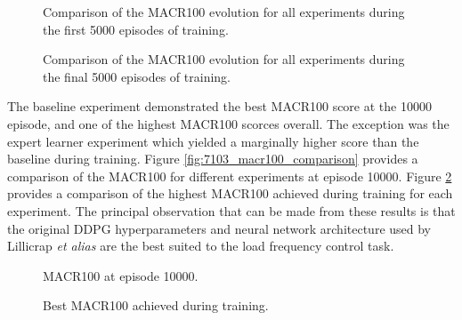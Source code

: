 \begin{figure}[h]
	\centering
	
	
	\caption{Comparison of the MACR100 evolution for all experiments during the first 5000 episodes of training.}\label{fig:7101_MACR100_first}
	
	\vspace{0.5cm}
	
	
	\caption{Comparison of the MACR100 evolution for all experiments during the final 5000 episodes of training.}\label{fig:7102_MACR100_second}
\end{figure}

\clearpage

The baseline experiment demonstrated the best MACR100 score at the 10000 episode, and one of the highest MACR100 scorces overall. The exception was the expert learner experiment which yielded a marginally higher score than the baseline during training. Figure \ref{fig:7103_macr100_comparison} provides a comparison of the MACR100 for different experiments at episode 10000. Figure \ref{fig:7104_macr100_comparison} provides a comparison of the highest MACR100 achieved during training for each experiment. The principal observation that can be made from these results is that the original DDPG hyperparameters and neural network architecture used by Lillicrap \textit{et alias} are the best suited to the load frequency control task.

\begin{figure}[h]
	\begin{minipage}{0.50\textwidth}
		\centering
		\resizebox{7cm}{!}{}
		\caption{MACR100 at episode 10000.}\label{fig:7103_macr100_comparison}
	\end{minipage}
	\hspace{0.25cm}
	\begin{minipage}{0.50\textwidth}
		\resizebox{7cm}{!}{}
		\caption{Best MACR100 achieved during training.}\label{fig:7104_macr100_comparison}
	\end{minipage}
\end{figure}
 
